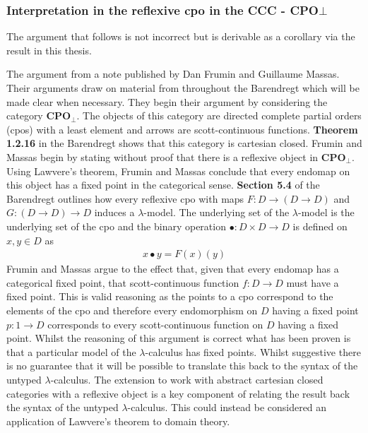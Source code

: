 \subsubsection{Interpretation in the reflexive cpo in the CCC -
\textbf{CPO}$\bot$}
The argument that follows is not incorrect but is derivable as a corollary via
the result in this thesis.

The argument from a note published by Dan Frumin and Guillaume
Massas. Their arguments draw on material from throughout the Barendregt
\cite{barendregt1992lambda} which will be made clear when necessary. They begin
their argument by considering the category \textbf{CPO}$_{\bot}$. The objects of
this category are directed complete partial orders (cpos) with a least element
and arrows are scott-continuous functions. \textbf{Theorem 1.2.16} in the
Barendregt shows that this category is cartesian closed. Frumin and Massas begin
by stating without proof that there is a reflexive object in
\textbf{CPO}$_{\bot}$.
Using Lawvere's theorem, Frumin and Massas conclude that every endomap on this
object has a fixed point in the categorical sense. \textbf{Section 5.4} of the
Barendregt outlines how every reflexive cpo with maps $F : D \rightarrow (D
\rightarrow D)$ and $G : (D \rightarrow D) \rightarrow D$ induces a
$\lambda$-model. The underlying set of the $\lambda$-model is the underlying set
of the cpo and the binary operation $\bullet : D \times D \rightarrow D$ is
defined on $x , y \in D$ as \begin{align*} x \bullet y = F(x)(y) \end{align*}
Frumin and Massas argue to the effect that, given that every endomap has a
categorical fixed point, that scott-continuous function $f : D \rightarrow D$
must have a fixed point. This is valid reasoning as the points to a cpo
correspond to the elements of the cpo and therefore every endomorphism on $D$
having a fixed point $p : 1 \rightarrow D$ corresponds to every scott-continuous
function on $D$ having a fixed point. Whilst the reasoning of this argument is
correct what has been proven is that a particular model of the
$\lambda$-calculus has fixed points. Whilst suggestive there is no guarantee
that it will be possible to translate this back to the syntax of the untyped
$\lambda$-calculus. The extension to work with abstract cartesian closed
categories with a reflexive object is a key component of relating the result
back the syntax of the untyped $\lambda$-calculus. This could instead be
considered an application of Lawvere's theorem to domain theory.

